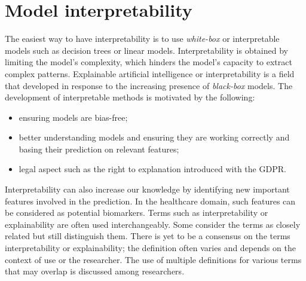 \documentclass[../main.tex]{subfiles}
\begin{document}
\section{Model interpretability}
	The easiest way to have interpretability is to use \textit{white-box} or interpretable models such as decision trees or linear models.
	Interpretability is obtained by limiting the model's complexity, which hinders the model's capacity to extract complex patterns.
	Explainable artificial intelligence or interpretability is a field that developed in response to the increasing presence of \textit{black-box} models.
	The development of interpretable methods is motivated by the following:
	\begin{itemize}[nosep]
		\item ensuring models are bias-free;
		\item better understanding models and ensuring they are working correctly and basing their prediction on relevant features;
		\item legal aspect such as the right to explanation introduced with the GDPR.
	\end{itemize}
	Interpretability can also increase our knowledge by identifying new important features involved in the prediction.
	In the healthcare domain, such features can be considered as potential biomarkers.
	Terms such as interpretability or explainability are often used interchangeably.
	Some consider the terms as closely related but still distinguish them.
	There is yet to be a consensus on the terms interpretability or explainability; the definition often varies and depends on the context of use or the researcher.
	The use of multiple definitions for various terms that may overlap is discussed among researchers.
\end{document}
